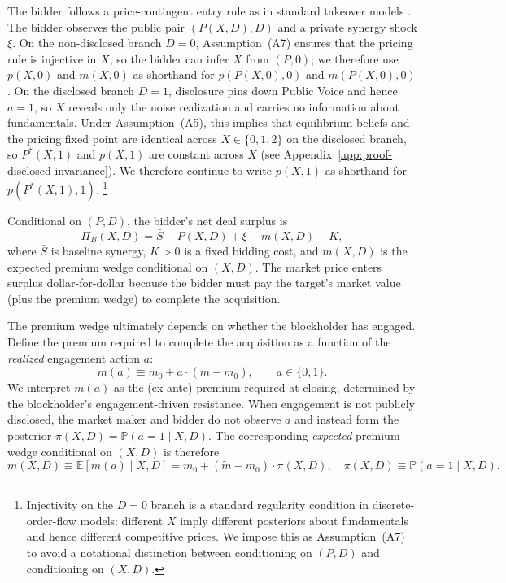 \documentclass[11pt]{article}
\newcommand{\E}{\mathbb{E}}
\newcommand{\PP}{\mathbb{P}}
\newcommand{\1}{\mathbf{1}}
\begin{document}
The bidder follows a price-contingent entry rule as in standard takeover models \citep{GrossmanHart1980,Fishman1988,BulowHuangKlemperer1999,EdmansGoldsteinJiang2012}. The bidder observes the public pair $(P(X,D), D)$ and a private synergy shock $\xi$. On the non-disclosed branch $D=0$, Assumption~\textup{(A7)} ensures that the pricing rule is injective in $X$, so the bidder can infer $X$ from $(P,0)$; we therefore use $p(X,0)$ and $m(X,0)$ as shorthand for $p(P(X,0),0)$ and $m(P(X,0),0)$. On the disclosed branch $D=1$, disclosure pins down Public Voice and hence $a=1$, so $X$ reveals only the noise realization and carries no information about fundamentals. Under Assumption~\textup{(A5)}, this implies that equilibrium beliefs and the pricing fixed point are identical across $X\in\{0,1,2\}$ on the disclosed branch, so $P^*(X,1)$ and $p(X,1)$ are constant across $X$ (see Appendix~\ref{app:proof-disclosed-invariance}). We therefore continue to write $p(X,1)$ as shorthand for $p(P^*(X,1),1)$.%
\footnote{Injectivity on the $D=0$ branch is a standard regularity condition in discrete-order-flow models: different $X$ imply different posteriors about fundamentals and hence different competitive prices. We impose this as Assumption~\textup{(A7)} to avoid a notational distinction between conditioning on $(P,D)$ and conditioning on $(X,D)$.}

Conditional on $(P,D)$, the bidder's net deal surplus is
\[
\Pi_B(X,D) = \bar{S} - P(X,D) + \xi - m(X,D) - K,
\]
where $\bar{S}$ is baseline synergy, $K > 0$ is a fixed bidding cost, and $m(X,D)$ is the expected premium wedge conditional on $(X,D)$. The market price enters surplus dollar-for-dollar because the bidder must pay the target's market value (plus the premium wedge) to complete the acquisition.

The premium wedge ultimately depends on whether the blockholder has engaged. Define the premium required to complete the acquisition as a function of the \emph{realized} engagement action $a$:
\[
m(a) \equiv m_0 + a\cdot(\tilde{m}-m_0), \qquad a\in\{0,1\}.
\]
We interpret $m(a)$ as the (ex-ante) premium required at closing, determined by the blockholder's engagement-driven resistance.
When engagement is not publicly disclosed, the market maker and bidder do not observe $a$ and instead form the posterior $\pi(X,D)=\PP(a=1 \mid X,D)$. The corresponding \emph{expected} premium wedge conditional on $(X,D)$ is therefore
\[
m(X,D) \equiv \E[m(a) \mid X,D] = m_0 + (\tilde{m} - m_0)\cdot \pi(X,D), \quad \pi(X,D) \equiv \PP(a = 1 \mid X, D).
\]
\end{document}
